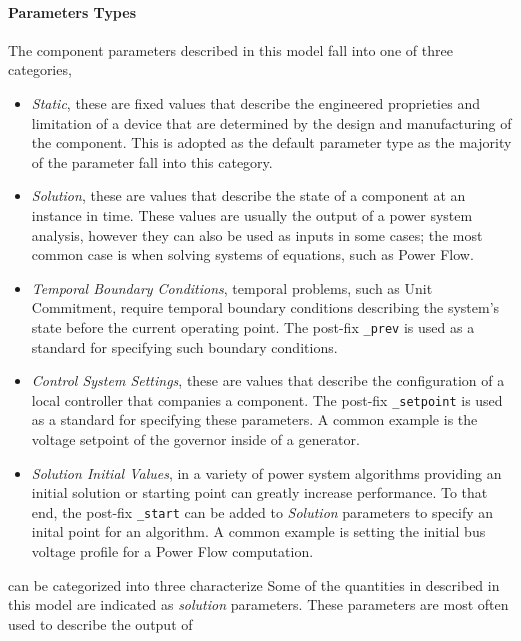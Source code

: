 \documentclass{article}
\begin{document}
\paragraph{Parameters Types}
%
The component parameters described in this model fall into one of three categories,
\begin{itemize}
    \item {\em Static}, these are fixed values that describe the engineered proprieties and limitation of a device that are determined by the design and manufacturing of the component. This is adopted as the default parameter type as the majority of the parameter fall into this category.
    \item {\em Solution}, these are values that describe the state of a component at an instance in time.  These values are usually the output of a power system analysis, however they can also be used as inputs in some cases; the most common case is when solving systems of equations, such as Power Flow.
    \item {\em Temporal Boundary Conditions}, temporal problems, such as Unit Commitment, require temporal boundary conditions describing the system's state before the current operating point.  The post-fix \texttt{\_prev} is used as a standard for specifying such boundary conditions.
    \item {\em Control System Settings}, these are values that describe the configuration of a local controller that companies a component.  The post-fix \texttt{\_setpoint} is used as a standard for specifying these parameters.  A common example is the voltage setpoint of the governor inside of a generator.
    \item {\em Solution Initial Values}, in a variety of power system algorithms providing an initial solution or starting point can greatly increase performance.  To that end, the post-fix \texttt{\_start} can be added to {\em Solution} parameters to specify an inital point for an algorithm.  A common example is setting the initial bus voltage profile for a Power Flow computation.
\end{itemize}


can be categorized into three characterize
Some of the quantities in described in this model are indicated as {\em solution} parameters. These parameters are most often used to describe the output of 
\end{document}
